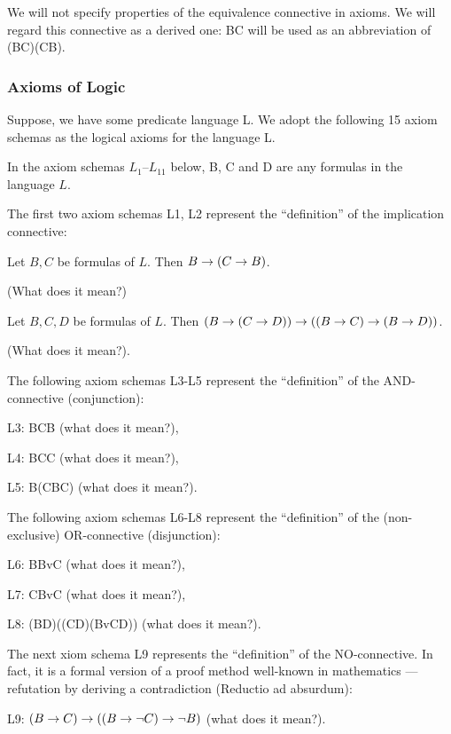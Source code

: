 We will not specify properties of the equivalence connective in axioms. We will regard this connective as a derived one: B\IFF C will be used as an abbreviation of (B\IMPLIES C)\AND (C\IMPLIES B).

\subsubsection*{Axioms of Logic}

Suppose, we have some predicate language L. We adopt the following 15 axiom schemas as the logical axioms for the language L.

In the axiom schemas \(L_1\)--\(L_{11}\) below, B, C and D are any formulas in the language \(L\).

The first two axiom schemas L1, L2 represent the ``definition'' of the implication connective:

\begin{axiom}
Let \(B,C\) be formulas of \(L\).
Then \(B\rightarrow (C\rightarrow B)\).
\end{axiom}
(What does it mean?)

\begin{axiom}
Let \(B,C,D\) be formulas of \(L\).
Then \((B\rightarrow (C\rightarrow D))\rightarrow ((B\rightarrow C)\rightarrow (B\rightarrow D))\).
\end{axiom}
(What does it mean?).

The following axiom schemas L3-L5 represent the ``definition'' of the AND-connective (conjunction):

L3: B\AND C\IMPLIES B (what does it mean?),

L4: B\AND C\IMPLIES C (what does it mean?),

L5: B\IMPLIES (C\IMPLIES B\AND C) (what does it mean?).

The following axiom schemas L6-L8 represent the ``definition'' of the (non-exclusive) OR-connective (disjunction):

L6: B\IMPLIES BvC (what does it mean?),

L7: C\IMPLIES BvC (what does it mean?),

L8: (B\IMPLIES D)\IMPLIES ((C\IMPLIES D)\IMPLIES (BvC\IMPLIES D)) (what does it mean?).

The next xiom schema L9 represents the ``definition'' of the NO-connective. In fact, it is a formal version of a proof method well-known in mathematics --- refutation by deriving a contradiction (Reductio ad absurdum):

L9: \((B\rightarrow C)\rightarrow ((B\rightarrow \neg C)\rightarrow \neg B)\) (what does it mean?).

